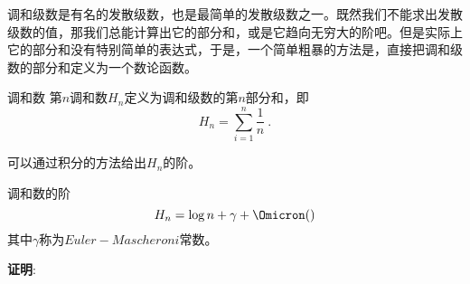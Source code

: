 

调和级数是有名的发散级数，也是最简单的发散级数之一。既然我们不能求出发散级数的值，那我们总能计算出它的部分和，或是它趋向无穷大的阶吧。但是实际上它的部分和没有特别简单的表达式，于是，一个简单粗暴的方法是，直接把调和级数的部分和定义为一个数论函数。

\begin{definition}{调和数}
第$n$调和数$H_n$定义为调和级数的第$n$部分和，即
\begin{equation}
H_n = \sum_{i=1}^n\frac{1}{n}~.
\end{equation}
\end{definition}

可以通过积分的方法给出$H_n$的阶。

\begin{theorem}{调和数的阶}
\begin{equation}
H_n = \log n + \gamma + \Omicron()
\end{equation}
其中$\gamma$称为$Euler-Mascheroni$常数。
\end{theorem}

\textbf{证明}:

\begin{equation}
\begin{aligned}

\end{aligned}
\end{equation}


